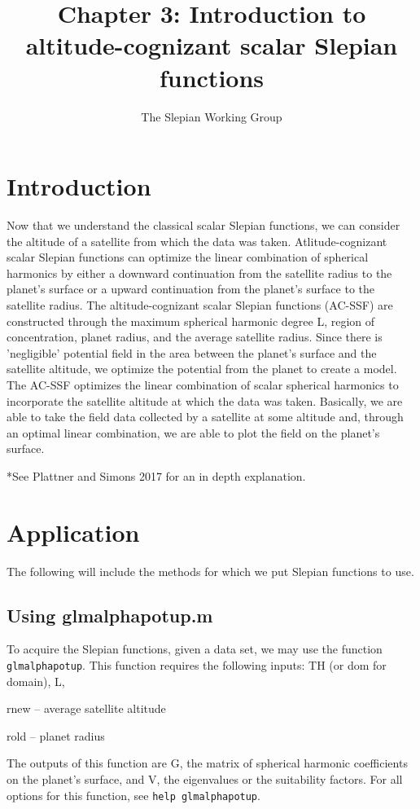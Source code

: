 \documentclass[11pt]{article}
\title{Chapter 3: Introduction to altitude-cognizant scalar Slepian functions}
\author{The Slepian Working Group}
\begin{document}
\maketitle

\section{Introduction}

Now that we understand the classical scalar Slepian functions, we can consider the altitude of a satellite from which the data was taken.   Atlitude-cognizant scalar Slepian functions can optimize the linear combination of spherical harmonics by either a downward continuation from the satellite radius to the planet's surface or a upward continuation from the planet's surface to the satellite radius.  The altitude-cognizant scalar Slepian functions (AC-SSF) are constructed through the maximum spherical harmonic degree L, region of concentration, planet radius, and the average satellite radius.  Since there is 'negligible' potential field in the area between the planet's surface and the satellite altitude, we optimize the potential from the planet to create a model.  The AC-SSF optimizes the linear combination of scalar spherical harmonics to incorporate the satellite altitude at which the data was taken.  Basically, we are able to take the field data collected by a satellite at some altitude and, through an optimal linear combination, we are able to plot the field on the planet's surface. 

*See Plattner and Simons 2017 for an in depth explanation.

\section{Application}

The following will include the methods for which we put Slepian functions to use.  

\subsection{Using glmalphapotup.m}
To acquire the Slepian functions, given a data set, we may use the function \verb+glmalphapotup+.  This function requires the following inputs: TH (or dom for domain), L, 

rnew -- average satellite altitude

rold -- planet radius

The outputs of this function are G, the matrix of spherical harmonic coefficients on the planet's surface, and V, the eigenvalues or the suitability factors. For all options for this function, see \verb+help glmalphapotup+.  
\end{document}
